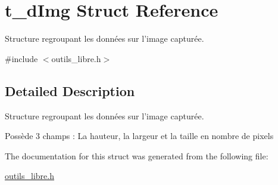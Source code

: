 \hypertarget{structt__dImg}{\section{t\-\_\-d\-Img Struct Reference}
\label{structt__dImg}
}


Structure regroupant les données sur l'image capturée.  




{\ttfamily \#include $<$outils\-\_\-libre.\-h$>$}



\subsection{Detailed Description}
Structure regroupant les données sur l'image capturée. 

Possède 3 champs \-: La hauteur, la largeur et la taille en nombre de pixels 

The documentation for this struct was generated from the following file\-:\begin{DoxyCompactItemize}
\item 
\hyperlink{outils__libre_8h}{outils\-\_\-libre.\-h}\end{DoxyCompactItemize}
